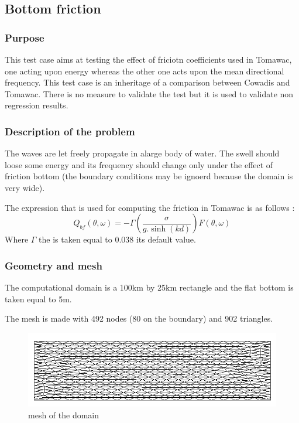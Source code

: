 \subsection{Bottom friction}
%

%
\subsubsection{Purpose}
%
This test case aims at testing the effect of friciotn coefficients used in
Tomawac, one acting upon energy whereas the other one acts upon the mean
directional frequency. This test case is an inheritage of a comparison between
Cowadis and Tomawac. There is no measure to validate the test but it is used to
validate non regression results.



%
\subsubsection{Description of the problem}
The waves are let freely propagate in alarge body of water. The swell should
loose some energy and its frequency should change only under the effect of
friction bottom (the boundary conditions may be ignoerd because the domain is
very wide).

The expression that is used for computing the friction in Tomawac is as follows :
\begin{equation}
Q_{bf}(\theta,\omega)=-\Gamma (\frac{\sigma}{g.\sinh(kd)})F(\theta,\omega)
\end{equation}
Where $\Gamma$ the  is taken equal to 0.038 its
default value.

\subsubsection{Geometry and mesh}
The computational domain is a 100km by 25km rectangle and the flat bottom is
taken equal to 5m.

The mesh is made with 492 nodes (80 on the boundary) and 902 triangles.

\begin{figure} [!h]
\centering
\includegraphics[scale = 0.65]{maillage.png}
 \caption{mesh of the domain}\label{mailbf}
\end{figure}

